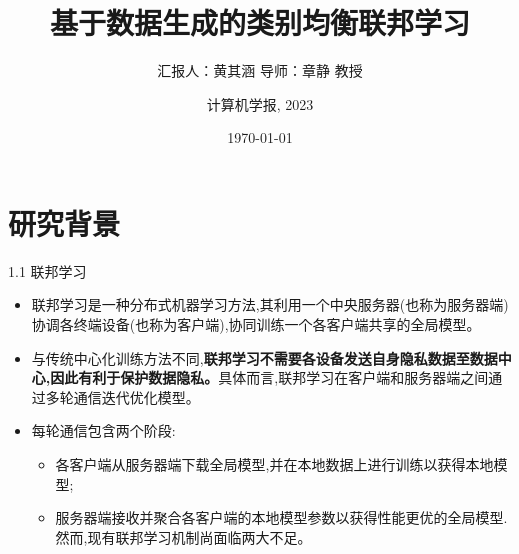 \documentclass{sintefbeamer}
\title{\huge 基于数据生成的类别均衡联邦学习}
\subtitle{汇报人：黄其涵 \qquad 导师：章静 教授 \qquad }
\author{计算机学报, 2023}
\date{\today}
\theoremstyle{definition}
\begin{document}
\maketitle


\section{研究背景}

\begin{frame}{1.1 联邦学习}
\begin{itemize}
\item 联邦学习是一种分布式机器学习方法,其利用一个中央服务器(也称为服务器端)协调各终端设备(也称为客户端),协同训练一个各客户端共享的全局模型。

\item 与传统中心化训练方法不同,\textbf{联邦学习不需要各设备发送自身隐私数据至数据中心,因此有利于保护数据隐私。}具体而言,联邦学习在客户端和服务器端之间通过多轮通信迭代优化模型。
\item 每轮通信包含两个阶段:
\begin{itemize}
\item[(1)]各客户端从服务器端下载全局模型,并在本地数据上进行训练以获得本地模型;
\item[(2)]服务器端接收并聚合各客户端的本地模型参数以获得性能更优的全局模型.然而,现有联邦学习机制尚面临两大不足。
\end{itemize}
\end{itemize}



\end{frame}
\end{document}
